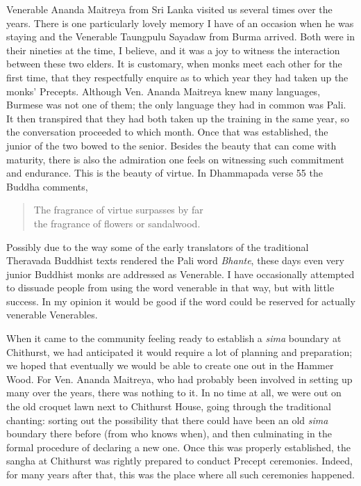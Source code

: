 Venerable Ananda Maitreya\cite{ananda}
from Sri Lanka visited us several times over
the years. There is one particularly lovely memory I have of an occasion
when he was staying and the Venerable Taungpulu Sayadaw\cite{taungpulu}
from Burma arrived. Both were in their
nineties at the time, I believe, and it was a joy to witness the
interaction between these two elders. It is customary, when monks meet
each other for the first time, that they respectfully enquire as to
which year they had taken up the monks' Precepts. Although Ven. Ananda
Maitreya knew many languages, Burmese was not one of them; the only
language they had in common was Pali. It then transpired that they had
both taken up the training in the same year, so the conversation
proceeded to which month. Once that was established, the junior of the
two bowed to the senior.
Besides the beauty that can come with maturity, there is also the
admiration one feels on witnessing such commitment and endurance. This
is the beauty of virtue. In Dhammapada verse 55 the Buddha comments,

\begin{quote}
  The fragrance of virtue surpasses by far\\
  the fragrance of flowers or sandalwood.
\end{quote}

Possibly due to the way some of the early translators of the traditional
Theravada Buddhist texts rendered the Pali word \emph{Bhante}, these days
even very junior Buddhist monks are addressed as Venerable.
I have occasionally attempted to dissuade people from using the word
venerable in that way, but with little success. In my opinion it would
be good if the word could be reserved for actually venerable
Venerables.

When it came to the community feeling ready to establish a \emph{sima} boundary\cite{sima}
at Chithurst, we had anticipated it would
require a lot of planning and preparation; we hoped that eventually we
would be able to create one out in the Hammer Wood. For Ven. Ananda
Maitreya, who had probably been involved in setting up many over the
years, there was nothing to it. In no time at all, we were out on the
old croquet lawn next to Chithurst House, going through the traditional
chanting: sorting out the possibility that there could have been an old
\emph{sima} boundary there before (from who knows when), and then
culminating in the formal procedure of declaring a new one. Once this
was properly established, the sangha at Chithurst was rightly prepared
to conduct Precept ceremonies. Indeed, for many years after that, this
was the place where all such ceremonies happened.

